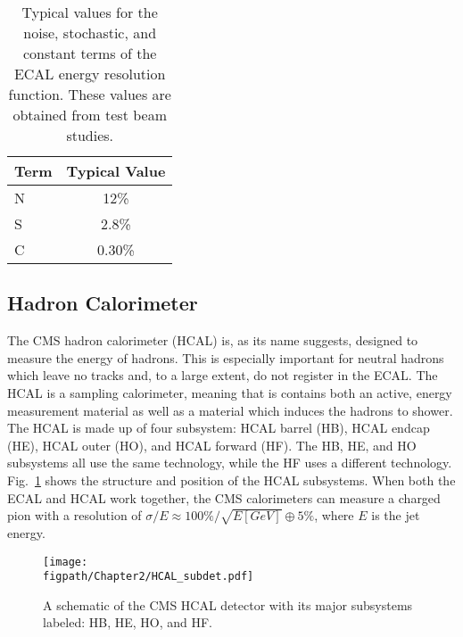 \begin{table}[htbp]
\caption{Typical values for the noise, stochastic, and constant terms of the ECAL energy resolution function. These values are obtained from test beam studies.}
\centering
\begin{tabular}{|l|c|}%
\hline %
Term & Typical Value \\%
\hline
N & 12\% \\%
S & 2.8\% \\%
C & 0.30\% \\%
\hline
\end{tabular}
\label{tab:ECAL_NSC}
\end{table}

\subsection{Hadron Calorimeter}
\label{sec:hadron_calorimeter}

The CMS hadron calorimeter (HCAL) is, as its name suggests, designed to measure the energy of hadrons.
This is especially important for neutral hadrons which leave no tracks and, to a large extent, do not register in the ECAL.
The HCAL is a sampling calorimeter, meaning that is contains both an active, energy measurement material as well as a material which induces the hadrons to shower.
The HCAL is made up of four subsystem: HCAL barrel (HB), HCAL endcap (HE), HCAL outer (HO), and HCAL forward (HF).
The HB, HE, and HO subsystems all use the same technology, while the HF uses a different technology.
Fig.~\ref{fig:CMS_HCAL} shows the structure and position of the HCAL subsystems.
When both the ECAL and HCAL work together, the CMS calorimeters can measure a charged pion with a resolution of $\sigma/E\approx100\%/\sqrt{E[GeV]}\oplus5\%$, where $E$ is the jet energy.

\begin{figure}[!hbt]
    \centering
    \texttt{[image: \\figpath/Chapter2/HCAL\_subdet.pdf]}
    \caption{A schematic of the CMS HCAL detector with its major subsystems labeled: HB, HE, HO, and HF.}
    \label{fig:CMS_HCAL}
\end{figure}

